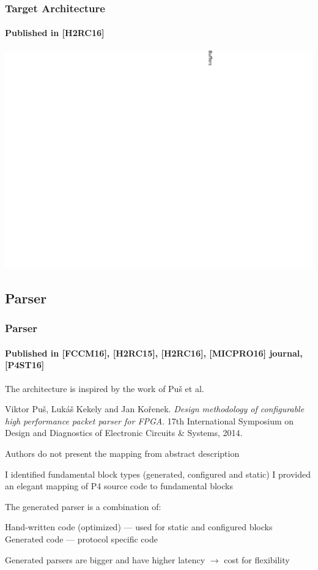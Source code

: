 \begin{frame} %
    \frametitle{Target Architecture}
    \framesubtitle{Published in [H2RC16]}
    {
    \hspace*{-26pt}
    \includegraphics[width=1.15\textwidth]{pic/p4-pipeline}
    }
\end{frame}

\subsection*{Parser}
\begin{frame}
    \frametitle{Parser}
    \framesubtitle{Published in [FCCM16], [H2RC15], [H2RC16], [MICPRO16] journal, [P4ST16]}
    \begin{itemize}
        \fitem The architecture is inspired by the work of Puš et al.
        \begin{itemize}
            \scriptsize
            \fitem[$\rightarrow$]  Viktor Puš, Lukáš Kekely and Jan Kořenek. \textit{Design methodology of configurable high performance packet parser for FPGA}. 17th International Symposium on Design and Diagnostics of Electronic Circuits \& Systems, 2014.
        \end{itemize}
        \fitem Authors do not present the mapping from abstract description
        \begin{itemize}
            \fitem I identified fundamental block types (generated, configured and static)
            \fitem I provided an elegant mapping of P4 source code to fundamental blocks
        \end{itemize}
        
        \fitem The generated parser is a combination of:
        \begin{itemize}
            \fitem Hand-written code (optimized) --- used for static and configured blocks
            \fitem Generated code --- protocol specific code
        \end{itemize}        
        \fitem Generated parsers are bigger and have higher latency $\rightarrow$ cost for flexibility
    \end{itemize}
\end{frame}

